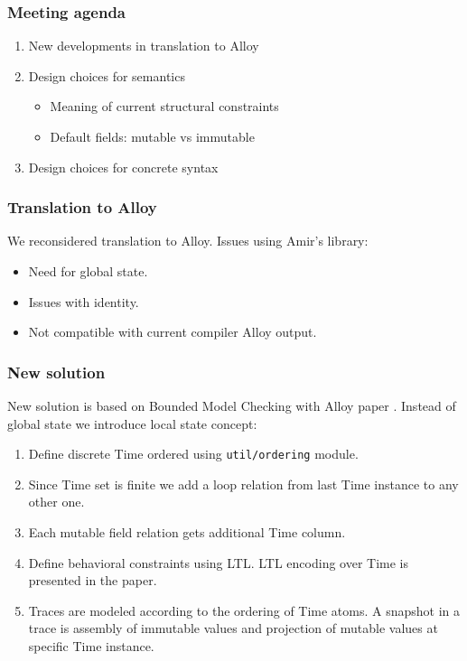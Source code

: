 \documentclass[xcolor=dvipsnames,12pt]{beamer}
\author{Paulius and Bogdan}
\date{May 29, 2013}
\begin{document}
  \begin{frame}
    \frametitle{Meeting agenda}
    \begin{enumerate}
      \item New developments in translation to Alloy
      \item Design choices for semantics
        \begin{itemize}
          \item Meaning of current structural constraints
          \item Default fields: mutable vs immutable
        \end{itemize}
      \item{Design choices for concrete syntax}
    \end{enumerate}
  \end{frame}

  \begin{frame}
    \frametitle{Translation to Alloy}
    We reconsidered translation to Alloy. Issues using Amir's library:
    \begin{itemize}
      \item{Need for global state.}
      \item{Issues with identity.}
      \item{Not compatible with current compiler Alloy output.}
    \end{itemize}

  \end{frame}

  \begin{frame}
    \frametitle{New solution}
    New solution is based on Bounded Model Checking with Alloy paper . Instead of global state we introduce local state concept:
    \begin{enumerate}
      \item{Define discrete Time ordered using \lstinline{util/ordering} module.}
      \item{Since Time set is finite we add a loop relation from last Time instance to any other one.}
      \item{Each mutable field relation gets additional Time column.}
      \item{Define behavioral constraints using LTL. LTL encoding over Time is presented in the paper.}
      \item{Traces are modeled according to the ordering of Time atoms. A snapshot in a trace is assembly of immutable values and projection of mutable values at specific Time instance.}
    \end{enumerate}
  \end{frame}
\end{document}
